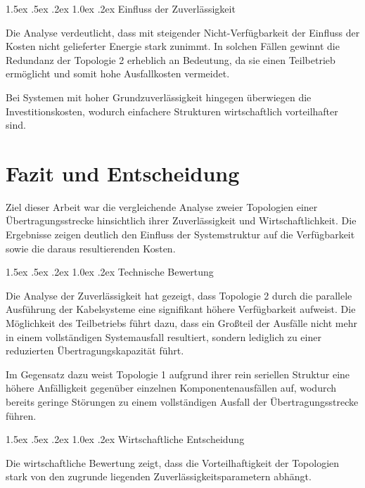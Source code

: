 \documentclass[a4paper,12pt]{article}
\makeatletter
\renewcommand\paragraph{\@startsection{paragraph}{4}{\z@}%
	{1.5ex \@plus .5ex \@minus .2ex}%
	{1.0ex \@plus .2ex}%
	{\normalfont\normalsize\bfseries}}%
\makeatother
\begin{document}
\paragraph{Einfluss der Zuverlässigkeit}

Die Analyse verdeutlicht, dass mit steigender Nicht-Verfügbarkeit der
Einfluss der Kosten nicht gelieferter Energie stark zunimmt. In solchen
Fällen gewinnt die Redundanz der Topologie 2 erheblich an Bedeutung, da
sie einen Teilbetrieb ermöglicht und somit hohe Ausfallkosten vermeidet.

Bei Systemen mit hoher Grundzuverlässigkeit hingegen überwiegen die
Investitionskosten, wodurch einfachere Strukturen wirtschaftlich
vorteilhafter sind.

\section{Fazit und Entscheidung}

Ziel dieser Arbeit war die vergleichende Analyse zweier Topologien einer
Übertragungsstrecke hinsichtlich ihrer Zuverlässigkeit und
Wirtschaftlichkeit. Die Ergebnisse zeigen deutlich den Einfluss der
Systemstruktur auf die Verfügbarkeit sowie die daraus resultierenden
Kosten.

\paragraph{Technische Bewertung}

Die Analyse der Zuverlässigkeit hat gezeigt, dass Topologie 2 durch die
parallele Ausführung der Kabelsysteme eine signifikant höhere
Verfügbarkeit aufweist. Die Möglichkeit des Teilbetriebs führt dazu, dass
ein Großteil der Ausfälle nicht mehr in einem vollständigen
Systemausfall resultiert, sondern lediglich zu einer reduzierten
Übertragungskapazität führt.

Im Gegensatz dazu weist Topologie 1 aufgrund ihrer rein seriellen
Struktur eine höhere Anfälligkeit gegenüber einzelnen
Komponentenausfällen auf, wodurch bereits geringe Störungen zu einem
vollständigen Ausfall der 
Übertragungsstrecke führen.

\paragraph{Wirtschaftliche Entscheidung}

Die wirtschaftliche Bewertung zeigt, dass die Vorteilhaftigkeit der
Topologien stark von den zugrunde liegenden Zuverlässigkeitsparametern
abhängt.
\end{document}
